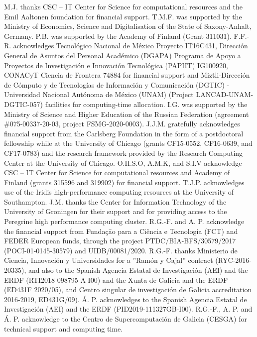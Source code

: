 \documentclass[journal=jpcbfk,manuscript=article]{achemso}
\begin{document}
\begin{acknowledgement}

M.J. thanks CSC -- IT Center for Science for computational resources and the Emil Aaltonen foundation for financial support.
T.M.F. was supported by the Ministry of Economics, Science
and Digitalisation of the State of Saxony-Anhalt, Germany.
P.B. was supported by the Academy of Finland (Grant 311031).
F.F.-R. acknowledges Tecnol\'{o}gico Nacional de M\'{e}xico Proyecto IT16C431, Direcci\'{o}n General de Asuntos del Personal Acad\'{e}mico (DGAPA) Programa de Apoyo a Proyectos de Investigaci\'{o}n e Innovaci\'{o}n Tecnol\'{o}gica (PAPIIT) IG100920, CONACyT Ciencia de Frontera 74884 for financial support and Miztli-Direcci\'{o}n de C\'{o}mputo y de Tecnolog\'{i}as de Informaci\'{o}n y Comunicaci\'{o}n (DGTIC) - Universidad Nacional Aut\'{o}noma de M{\'e}xico (UNAM) (Project LANCAD-UNAM-DGTIC-057) facilities for computing-time allocation.
I.G. was supported by the Ministry of Science and Higher Education of the Russian Federation (agreement \#075-00337-20-03, project FSMG-2020-0003). 
J.J.M. gratefully acknowledges financial support from the Carlsberg 
Foundation in the form of a postdoctoral fellowship while at 
the University of Chicago (grants CF15-0552, CF16-0639, and 
CF17-0783) and the research framework provided by the 
Research Computing Center at the University of Chicago.
O.H.S.O, A.M.K, and S.I.V acknowledge CSC -- IT Center for Science for computational resources and Academy of Finland (grants 315596 and 319902) for financial support.
T.J.P. acknowledges use of the Iridis high-performance computing resources at the University of Southampton.
J.M. thanks the Center for Information Technology of the University of Groningen for their support and for providing access to the Peregrine high performance computing cluster. R.G.-F. and A. P. acknowledge the financial support from Funda{\c c}{\=a}o para a Ci{\^ e}ncia e Tecnologia (FCT) and FEDER European funds, through the project PTDC/BIA-BFS/30579/2017 (POCI-01-0145-30579) and UIDB/00081/2020. R.G.-F. thanks Ministerio de Ciencia, Innovaci{\'o}n y Universidades for a ''Ram{\'o}n y Cajal'' contract (RYC-2016-20335), and also to the Spanish Agencia Estatal de Investigaci{\'o}n (AEI) and the ERDF (RTI2018-098795-A-I00) and the Xunta de Galicia and the ERDF (ED431F 2020/05), and Centro singular de investigaci{\'o}n de Galicia accreditation 2016-2019, ED431G/09). {\'A}. P. acknowledges to the Spanish Agencia Estatal de Investigaci{\'o}n (AEI) and the ERDF (PID2019-111327GB-I00). R.G.-F., A. P. and {\'A}. P. acknowledge to the Centro de Supercomputaci{\'o}n de Galicia (CESGA) for technical support and computing time.


\end{acknowledgement}



\end{document}
